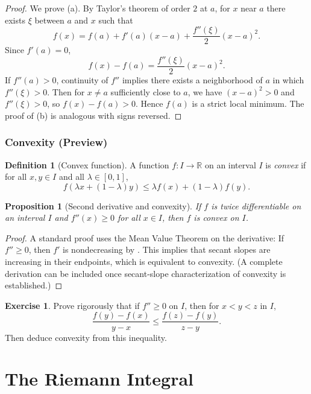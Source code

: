 \documentclass[12pt]{article}
\numberwithin{equation}{section}
\newcommand{\RR}{\mathbb{R}}
\theoremstyle{plain}
\newtheorem{proposition}[theorem]{Proposition}
\theoremstyle{definition}
\newtheorem{definition}[theorem]{Definition}
\newtheorem{exercise}[theorem]{Exercise}
\theoremstyle{remark}
\begin{document}
\begin{proof}
We prove (a). By Taylor's theorem of order $2$ at $a$, for $x$ near $a$ there exists $\xi$ between $a$ and $x$ such that
\[
f(x)=f(a)+f'(a)(x-a)+\frac{f''(\xi)}{2}(x-a)^2.
\]
Since $f'(a)=0$,
\[
f(x)-f(a)=\frac{f''(\xi)}{2}(x-a)^2.
\]
If $f''(a)>0$, continuity of $f''$ implies there exists a neighborhood of $a$ in which $f''(\xi)>0$.
Then for $x\neq a$ sufficiently close to $a$, we have $(x-a)^2>0$ and $f''(\xi)>0$, so $f(x)-f(a)>0$.
Hence $f(a)$ is a strict local minimum. The proof of (b) is analogous with signs reversed.
\end{proof}

\subsubsection{Convexity (Preview)}

\begin{definition}[Convex function]
A function $f:I\to\RR$ on an interval $I$ is \emph{convex} if for all $x,y\in I$ and all $\lambda\in[0,1]$,
\[
f(\lambda x+(1-\lambda)y)\le \lambda f(x)+(1-\lambda)f(y).
\]
\end{definition}

\begin{proposition}[Second derivative and convexity]\label{prop:convex-second}
If $f$ is twice differentiable on an interval $I$ and $f''(x)\ge 0$ for all $x\in I$, then $f$ is convex on $I$.
\end{proposition}

\begin{proof}
A standard proof uses the Mean Value Theorem on the derivative:
If $f''\ge 0$, then $f'$ is nondecreasing by .
This implies that secant slopes are increasing in their endpoints, which is equivalent to convexity.
(A complete derivation can be included once secant-slope characterization of convexity is established.)
\end{proof}

\begin{exercise}
Prove rigorously that if $f''\ge 0$ on $I$, then for $x<y<z$ in $I$,
\[
\frac{f(y)-f(x)}{y-x}\le \frac{f(z)-f(y)}{z-y}.
\]
Then deduce convexity from this inequality.
\end{exercise}

\newpage


\section{The Riemann Integral}
\end{document}
